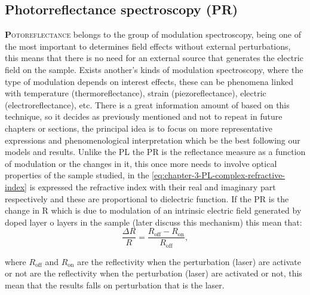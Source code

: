 \subsection{Photorreflectance spectroscopy (PR)}
\label{subsec:chapter-3-pr}
\vspace{-10mm} 
\lettrine[lines=3, lraise=.1, nindent=0mm, slope=0mm]{\textbf{P}}{otoreflectance} belongs to the group of modulation spectroscopy, being one of the most important to determines field effects without external perturbations, this means that there is no need for an external source that generates the electric field on the sample. Exists another's kinds of modulation spectroscopy, where the type of modulation depends on interest effects, these can be phenomena linked with temperature (thermoreflectance), strain (piezoreflectance), electric (electroreflectance), etc. There is a great information amount of based on this technique, so it decides as previously mentioned and not to repeat in future chapters or sections, the principal idea is to focus on more representative expressions and phenomenological interpretation which be the best following our models and results. Unlike the PL the PR is the reflectance measure as a function of modulation or the changes in it, this once more needs to involve optical properties of the sample studied, in the \cref{eq:chapter-3-PL-complex-refractive-index} is expressed the refractive index with their real and imaginary part respectively and these are proportional to dielectric function. If the PR is the change in R which is due to modulation of an intrinsic electric field generated by doped layer o layers in the sample (later discuss this mechanism) this mean that:
\begin{equation}
	\dfrac{\Delta R}{R} = \dfrac{R_{\mathrm{off}}-R_{\mathrm{on}}}{R_{\mathrm{off}}},
	\label{eq:chapter-3-PR-mechanis}
\end{equation}


where $R_{\mathrm{off}}$ and $R_{\mathrm{on}}$ are the reflectivity when the perturbation (laser) are activate or not  are the reflectivity when the perturbation (laser) are activated or not, this mean that the results  falls on perturbation that is the laser.


